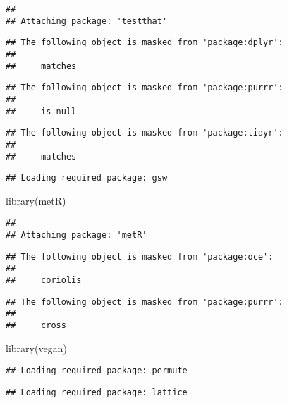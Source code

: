 \documentclass[
]{article}
\newenvironment{Shaded}{\begin{snugshade}}{\end{snugshade}}
\newcommand{\FunctionTok}[1]{\textcolor[rgb]{0.00,0.00,0.00}{#1}}
\newcommand{\NormalTok}[1]{#1}
\begin{document}
\begin{verbatim}
## 
## Attaching package: 'testthat'
\end{verbatim}

\begin{verbatim}
## The following object is masked from 'package:dplyr':
## 
##     matches
\end{verbatim}

\begin{verbatim}
## The following object is masked from 'package:purrr':
## 
##     is_null
\end{verbatim}

\begin{verbatim}
## The following object is masked from 'package:tidyr':
## 
##     matches
\end{verbatim}

\begin{verbatim}
## Loading required package: gsw
\end{verbatim}

\begin{Shaded}
\begin{Highlighting}[]
\FunctionTok{library}\NormalTok{(metR)}
\end{Highlighting}
\end{Shaded}

\begin{verbatim}
## 
## Attaching package: 'metR'
\end{verbatim}

\begin{verbatim}
## The following object is masked from 'package:oce':
## 
##     coriolis
\end{verbatim}

\begin{verbatim}
## The following object is masked from 'package:purrr':
## 
##     cross
\end{verbatim}

\begin{Shaded}
\begin{Highlighting}[]
\FunctionTok{library}\NormalTok{(vegan)}
\end{Highlighting}
\end{Shaded}

\begin{verbatim}
## Loading required package: permute
\end{verbatim}

\begin{verbatim}
## Loading required package: lattice
\end{verbatim}
\end{document}
